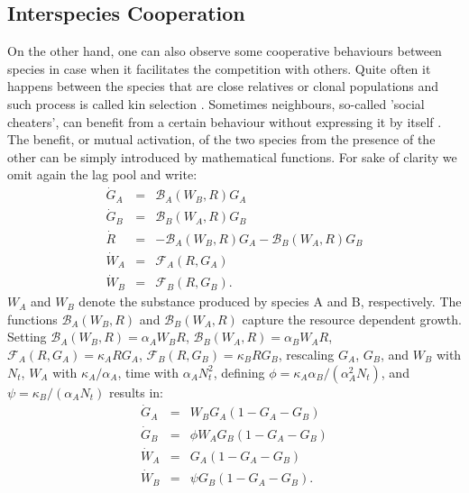 \documentclass[10pt,A4paper]{article}
\begin{document}
\subsection{Interspecies Cooperation}
On the other hand, one can also observe some cooperative behaviours between species in case when it facilitates the competition with others.
Quite often it happens between the species that are close relatives or clonal populations and such process is called kin selection \cite{west_social_2007}.
Sometimes neighbours, so-called 'social cheaters', can benefit from a certain behaviour without expressing it by itself \cite{rainey_evolution_2003}.
%
%
%
The benefit, or mutual activation, of the two species from the presence of the other can be simply introduced by mathematical functions. 
For sake of clarity we omit again the lag pool and write:
\begin{eqnarray}
    \dot{G}_A &=& \mathcal{B}_A(W_B,R)G_A\\
    \dot{G}_B &=& \mathcal{B}_B(W_A,R)G_B\\
    \dot{R} &=&-\mathcal{B}_A(W_B,R)G_A-\mathcal{B}_B(W_A,R)G_B\\
    \dot{W}_A &=& \mathcal{F}_A(R,G_A)\\
    \dot{W}_B &=& \mathcal{F}_B(R,G_B).
\end{eqnarray}
$W_A$ and $W_B$ denote the substance produced by species A and B, respectively. 
The functions $\mathcal{B}_A(W_B,R)$ and $\mathcal{B}_B(W_A,R)$ capture the resource dependent growth. 
Setting $\mathcal{B}_A(W_B,R)=\alpha_A W_BR$, $\mathcal{B}_B(W_A,R)=\alpha_B W_AR$, $\mathcal{F}_A(R,G_A)=\kappa_A RG_A$, $\mathcal{F}_B(R,G_B)=\kappa_B RG_B$, rescaling $G_A$, $G_B$, and $W_B$ with $N_t$, $W_A$ with $\kappa_A/\alpha_A$, time with $\alpha_AN_t^2$, defining $\phi=\kappa_A\alpha_B/(\alpha_A^2N_t)$, and $\psi=\kappa_B/(\alpha_A N_t)$ results in: 
\begin{eqnarray}
    \dot{G}_A &=& W_BG_A\left(1 - G_A-G_B\right)\\
    \dot{G}_B &=& \phi W_AG_B\left(1 - G_A-G_B\right)\\
    \dot{W}_A &=& G_A\left(1 - G_A-G_B\right)\\
    \dot{W}_B &=&\psi G_B\left(1 - G_A-G_B\right).
\end{eqnarray}
%
%
\end{document}
